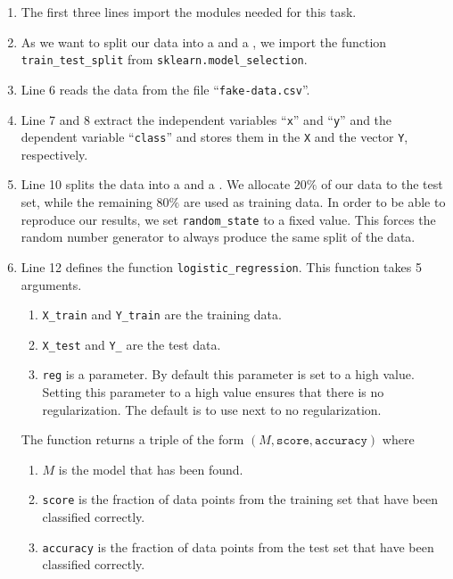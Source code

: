 \begin{enumerate}
\item The first three lines import the modules needed for this task.
\item As we want to split our data into a  and a , we import the function
      \texttt{train\_test\_split} from \texttt{sklearn.model\_selection}.
\item Line 6 reads the data from the file ``\texttt{fake-data.csv}''.
\item Line 7 and 8 extract the independent variables ``\texttt{x}'' and ``\texttt{y}'' and the dependent
      variable ``\texttt{class}'' and stores them in the  \texttt{X} and the vector
      \texttt{Y}, respectively.
\item Line 10 splits the data into a  and a .  We allocate $20\%$ of our data
      to the test set, while the remaining $80\%$ are used as training data.
      In order to be able to reproduce our results, we set \texttt{random\_state} to a fixed value.
      This forces the random number generator to always produce the same split of the data.
\item Line 12 defines the function \texttt{logistic\_regression}.  This function takes 5 arguments.
      \begin{enumerate}
      \item \texttt{X\_train} and \texttt{Y\_train} are the training data.
      \item \texttt{X\_test} and \texttt{Y\_} are the test data.
      \item \texttt{reg} is a  parameter.  By default this parameter is set to a high
            value.  Setting this parameter to a high value ensures that there is no regularization.
            The default is to use next to no regularization.
      \end{enumerate}
      The function returns a triple of the form $(M, \mathtt{score}, \mathtt{accuracy})$ where
      \begin{enumerate}
      \item $M$ is the model that has been found.
      \item \texttt{score} is the fraction of data points from the training set that have been
            classified correctly.
      \item \texttt{accuracy} is the fraction of data points from the test set that have been
            classified correctly.
      \end{enumerate}

\end{enumerate}

